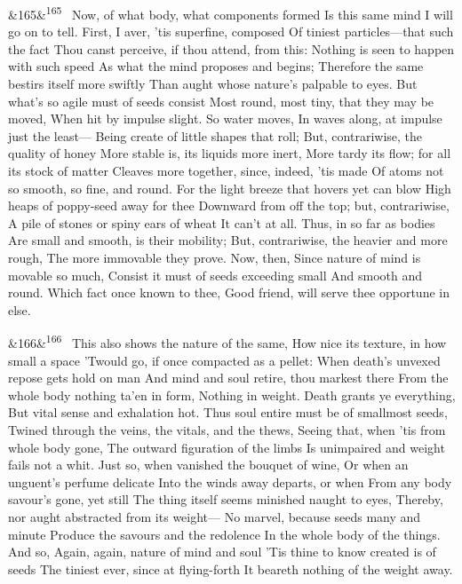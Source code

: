 \documentclass[12pt]{article}
\newcommand{\para}[1][]{\par\noindent\ifx&#1&\else\textsuperscript{\footnotesize #1}~\fi}
\begin{document}
\para[165] Now, of what body, what components formed Is this same mind I will go on to tell. First, I aver, 'tis superfine, composed Of tiniest particles---that such the fact Thou canst perceive, if thou attend, from this: Nothing is seen to happen with such speed As what the mind proposes and begins; Therefore the same bestirs itself more swiftly Than aught whose nature's palpable to eyes. But what's so agile must of seeds consist Most round, most tiny, that they may be moved, When hit by impulse slight. So water moves, In waves along, at impulse just the least--- Being create of little shapes that roll; But, contrariwise, the quality of honey More stable is, its liquids more inert, More tardy its flow; for all its stock of matter Cleaves more together, since, indeed, 'tis made Of atoms not so smooth, so fine, and round. For the light breeze that hovers yet can blow High heaps of poppy-seed away for thee Downward from off the top; but, contrariwise, A pile of stones or spiny ears of wheat It can't at all. Thus, in so far as bodies Are small and smooth, is their mobility; But, contrariwise, the heavier and more rough, The more immovable they prove. Now, then, Since nature of mind is movable so much, Consist it must of seeds exceeding small And smooth and round. Which fact once known to thee, Good friend, will serve thee opportune in else.

\para[166] This also shows the nature of the same, How nice its texture, in how small a space 'Twould go, if once compacted as a pellet: When death's unvexed repose gets hold on man And mind and soul retire, thou markest there From the whole body nothing ta'en in form, Nothing in weight. Death grants ye everything, But vital sense and exhalation hot. Thus soul entire must be of smallmost seeds, Twined through the veins, the vitals, and the thews, Seeing that, when 'tis from whole body gone, The outward figuration of the limbs Is unimpaired and weight fails not a whit. Just so, when vanished the bouquet of wine, Or when an unguent's perfume delicate Into the winds away departs, or when From any body savour's gone, yet still The thing itself seems minished naught to eyes, Thereby, nor aught abstracted from its weight--- No marvel, because seeds many and minute Produce the savours and the redolence In the whole body of the things. And so, Again, again, nature of mind and soul 'Tis thine to know created is of seeds The tiniest ever, since at flying-forth It beareth nothing of the weight away.
\end{document}
